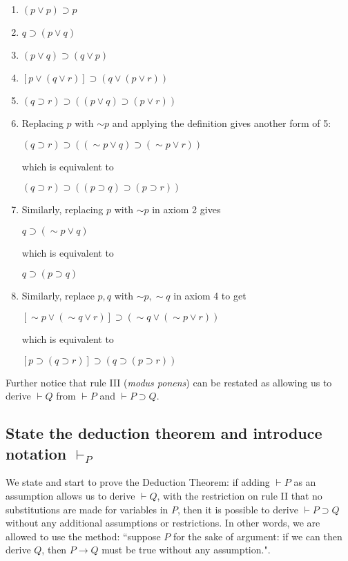 \documentclass[12pt]{article}
\begin{document}
\begin{enumerate}

\item $(p \vee p) \supset p$

\item $q \supset (p \vee q)$

\item $(p \vee q) \supset (q \vee p)$

\item $[p \vee (q \vee r)] \supset (q \vee (p \vee r))$

\item $( q \supset r) \supset ((p \vee q) \supset (p \vee r))$

\item Replacing $p$ with $\sim p$ and applying the definition gives another form of 5:

 $( q \supset r) \supset ((\sim p \vee q) \supset (\sim p \vee r))$

which is equivalent to

 $( q \supset r) \supset ((p \supset q) \supset (p \supset r))$

\item  Similarly, replacing $p$ with $\sim p$ in axiom 2 gives

$q \supset (\sim p \vee q)$

which is equivalent to

$q \supset (p \supset q)$

\item Similarly, replace $p,q$ with $\sim p,\sim q$ in axiom 4 to get 

$[\sim p \vee (\sim q \vee r)] \supset (\sim q \vee (\sim p \vee r))$

which is equivalent to 

$[p \supset (q \supset  r)] \supset (q \supset  (p \supset r))$

\end{enumerate}

Further notice that rule III ({\em modus ponens}) can be restated as allowing us to derive $\vdash Q$ from $\vdash P$ and $\vdash P \supset Q$.

\subsection{State the deduction theorem and introduce notation $\vdash_P$}

We state  and start to prove the Deduction Theorem:  if adding $\vdash P$ as an assumption allows us to derive $\vdash Q$, with the restriction on rule II that no substitutions are made
for variables in $P$, then it is possible to derive $\vdash P \supset Q$ without any additional assumptions or restrictions.  In other words, we are allowed to use the method:
``suppose $P$ for the sake of argument:  if we can then derive $Q$, then $P \rightarrow Q$ must be true without any assumption.".
\end{document}
